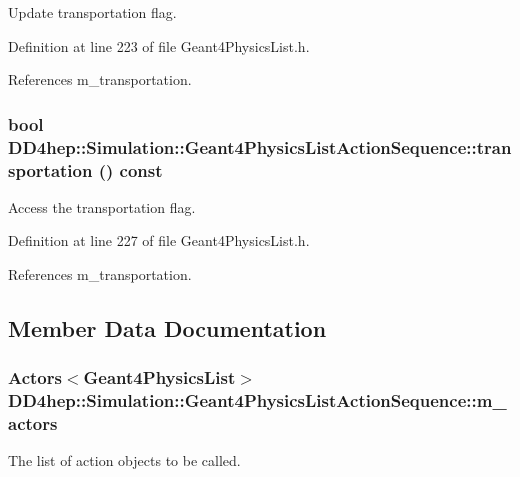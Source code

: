 Update transportation flag. 

Definition at line 223 of file Geant4PhysicsList.h.

References m\_\-transportation.\hypertarget{class_d_d4hep_1_1_simulation_1_1_geant4_physics_list_action_sequence_a5ca7f8265fef770ee4e7a1b9bcadf545}{
\subsubsection[{transportation}]{\setlength{\rightskip}{0pt plus 5cm}bool DD4hep::Simulation::Geant4PhysicsListActionSequence::transportation () const}}
\label{class_d_d4hep_1_1_simulation_1_1_geant4_physics_list_action_sequence_a5ca7f8265fef770ee4e7a1b9bcadf545}


Access the transportation flag. 

Definition at line 227 of file Geant4PhysicsList.h.

References m\_\-transportation.

\subsection{Member Data Documentation}
\hypertarget{class_d_d4hep_1_1_simulation_1_1_geant4_physics_list_action_sequence_a7b456f14e717d23f85827b8e0c8bab72}{
\subsubsection[{m\_\-actors}]{\setlength{\rightskip}{0pt plus 5cm}Actors$<${\bf Geant4PhysicsList}$>$ {\bf DD4hep::Simulation::Geant4PhysicsListActionSequence::m\_\-actors}}}
\label{class_d_d4hep_1_1_simulation_1_1_geant4_physics_list_action_sequence_a7b456f14e717d23f85827b8e0c8bab72}


The list of action objects to be called. 

